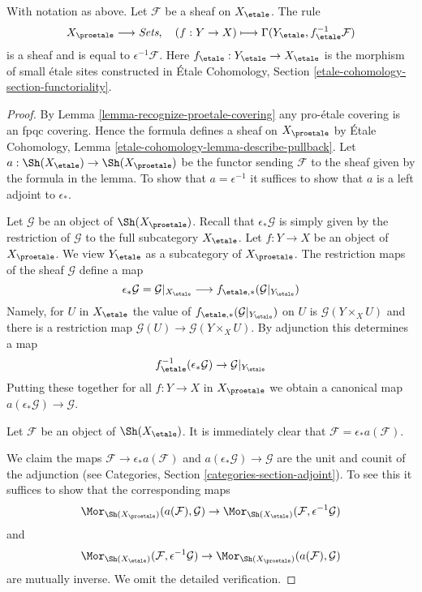 \begin{lemma}
\label{lemma-describe-pullback-from-etale}
With notation as above. Let $\mathcal{F}$ be a sheaf on $X_\etale$.
The rule
$$
X_\proetale \longrightarrow \textit{Sets},\quad
(f : Y \to X) \longmapsto \Gamma(Y_\etale, f_\etale^{-1}\mathcal{F})
$$
is a sheaf and is equal to $\epsilon^{-1}\mathcal{F}$.
Here $f_\etale : Y_\etale \to X_\etale$ is the morphism of
small \'etale sites constructed in
\'Etale Cohomology, Section \ref{etale-cohomology-section-functoriality}.
\end{lemma}

\begin{proof}
By Lemma \ref{lemma-recognize-proetale-covering} any pro-\'etale covering
is an fpqc covering. Hence the formula defines a sheaf on $X_\proetale$
by \'Etale Cohomology, Lemma \ref{etale-cohomology-lemma-describe-pullback}.
Let $a : \Sh(X_\etale) \to \Sh(X_\proetale)$ be the functor
sending $\mathcal{F}$ to the sheaf given by the formula in the lemma.
To show that $a = \epsilon^{-1}$ it suffices to show that $a$ is a
left adjoint to $\epsilon_*$.

\medskip\noindent
Let $\mathcal{G}$ be an object of $\Sh(X_\proetale)$.
Recall that $\epsilon_*\mathcal{G}$ is simply given by the restriction of
$\mathcal{G}$ to the full subcategory $X_\etale$.
Let $f : Y \to X$ be an object of $X_\proetale$.
We view $Y_\etale$ as a subcategory of $X_\proetale$.
The restriction maps of the sheaf $\mathcal{G}$ define a map
$$
\epsilon_*\mathcal{G} = \mathcal{G}|_{X_\etale}
\longrightarrow
f_{\etale, *}(\mathcal{G}|_{Y_\etale})
$$
Namely, for $U$ in $X_\etale$ the value of
$f_{\etale, *}(\mathcal{G}|_{Y_\etale})$ on $U$
is $\mathcal{G}(Y \times_X U)$ and there is a restriction
map $\mathcal{G}(U) \to \mathcal{G}(Y \times_X U)$.
By adjunction this determines a map
$$
f_\etale^{-1}(\epsilon_*\mathcal{G}) \to \mathcal{G}|_{Y_\etale}
$$
Putting these together for all $f : Y \to X$ in $X_\proetale$
we obtain a canonical map $a(\epsilon_*\mathcal{G}) \to \mathcal{G}$.

\medskip\noindent
Let $\mathcal{F}$ be an object of $\Sh(X_\etale)$. It is immediately
clear that $\mathcal{F} = \epsilon_*a(\mathcal{F})$.

\medskip\noindent 
We claim the maps $\mathcal{F} \to \epsilon_*a(\mathcal{F})$ and
$a(\epsilon_*\mathcal{G}) \to \mathcal{G}$
are the unit and counit of the adjunction (see
Categories, Section \ref{categories-section-adjoint}).
To see this it suffices to show that the corresponding maps
$$
\Mor_{\Sh(X_\proetale)}(a(\mathcal{F}), \mathcal{G}) \to
\Mor_{\Sh(X_\etale)}(\mathcal{F}, \epsilon^{-1}\mathcal{G})
$$
and
$$
\Mor_{\Sh(X_\etale)}(\mathcal{F}, \epsilon^{-1}\mathcal{G}) \to
\Mor_{\Sh(X_\proetale)}(a(\mathcal{F}), \mathcal{G})
$$
are mutually inverse. We omit the detailed verification.
\end{proof}


